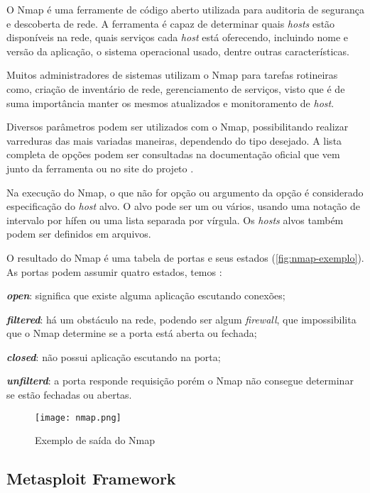 O Nmap é uma ferramente de código aberto utilizada para auditoria de segurança e descoberta de rede. A ferramenta é capaz de determinar quais \textit{hosts} estão disponíveis na rede, quais serviços cada \textit{host} está oferecendo, incluindo nome e versão da aplicação, o sistema operacional usado, dentre outras características.  

Muitos administradores de sistemas utilizam o Nmap para tarefas rotineiras como, criação de inventário de rede, gerenciamento de serviços, visto que é de suma importância manter os mesmos atualizados e monitoramento de \textit{host}.

 Diversos parâmetros podem ser utilizados com o Nmap, possibilitando realizar varreduras das mais variadas maneiras, dependendo do tipo desejado. A lista completa de opções podem ser consultadas na documentação oficial que vem junto da ferramenta ou no site do projeto \cite{nmap}. 

 Na execução do Nmap, o que não for opção ou argumento da opção é considerado especificação do \textit{host} alvo. O alvo pode ser um ou vários, usando uma notação de intervalo por hífen ou uma lista separada por vírgula. Os \textit{hosts} alvos também podem ser definidos em arquivos.

O resultado do Nmap é uma tabela de portas e seus estados (\autoref{fig:nmap-exemplo}). As portas podem assumir quatro estados, temos \cite{nmap}: 
\begin{alineas}
\item \textbf{\textit{open}}: significa que existe alguma aplicação escutando conexões; 
\item \textbf{\textit{filtered}}: há um obstáculo na rede, podendo ser algum \textit{firewall}, que impossibilita que o Nmap determine se a porta está aberta ou fechada; 
\item \textbf{\textit{closed}}: não possui aplicação escutando na porta; 
\item \textbf{\textit{unfilterd}}: a porta responde requisição porém o Nmap não consegue determinar se estão fechadas ou abertas.
\end{alineas}

 \begin{figure}[!htb]
  \centering
  \caption{Exemplo de saída do Nmap}
  \texttt{[image: nmap.png]}
  \label{fig:nmap-exemplo}
 \end{figure}

\subsection{Metasploit Framework} \label{sec:metasploit}

